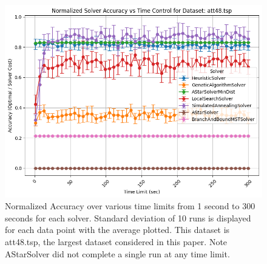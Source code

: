 \documentclass[11pt]{article}
\begin{document}
	\begin{figure}[H]
		\centering
		\includegraphics[width=0.7\linewidth]{figures/accuracy_line_att48.tsp}
		\caption{Normalized Accuracy over various time limits from 1 second to 300 seconds for each solver. Standard deviation of 10 runs is displayed for each data point with the average plotted. This dataset is att48.tsp, the largest dataset considered in this paper. Note AStarSolver did not complete a single run at any time limit.}
		\label{fig:accuracylineatt48}
	\end{figure}
	
\end{document}
